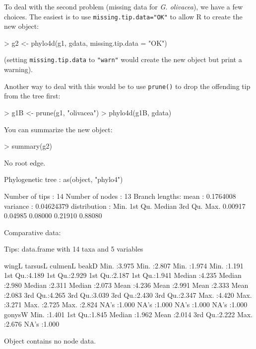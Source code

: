 \documentclass{article}
\newcommand{\code}[1]{{{\tt #1}}}
\begin{document}
To deal with the second problem
(missing data for \emph{G. olivacea}), we have a few choices.
The easiest is to use \code{missing.tip.data="OK"}
to allow R to create the new object:
\begin{Schunk}
\begin{Sinput}
> g2 <- phylo4d(g1, gdata, missing.tip.data = "OK")
\end{Sinput}
\end{Schunk}
(setting \code{missing.tip.data} to \code{"warn"}
would create the new object but print a warning).

Another way to deal with this would be to 
use \code{prune()} to drop
the offending tip from the tree first:
\begin{Schunk}
\begin{Sinput}
> g1B <- prune(g1, "olivacea")
> phylo4d(g1B, gdata)
\end{Sinput}
\end{Schunk}

You can summarize the new object:
\begin{Schunk}
\begin{Sinput}
> summary(g2)
\end{Sinput}
\begin{Soutput}
  No root edge.

 Phylogenetic tree : as(object, "phylo4") 

 Number of tips    : 14 
 Number of nodes   : 13 
 Branch lengths:
        mean         : 0.1764008 
        variance     : 0.04624379 
        distribution :
   Min. 1st Qu.  Median 3rd Qu.    Max. 
0.00917 0.04985 0.08000 0.21910 0.88080 

Comparative data:

Tips: data.frame with 14 taxa and 5 variables 

     wingL          tarsusL         culmenL          beakD      
 Min.   :3.975   Min.   :2.807   Min.   :1.974   Min.   :1.191  
 1st Qu.:4.189   1st Qu.:2.929   1st Qu.:2.187   1st Qu.:1.941  
 Median :4.235   Median :2.980   Median :2.311   Median :2.073  
 Mean   :4.236   Mean   :2.991   Mean   :2.333   Mean   :2.083  
 3rd Qu.:4.265   3rd Qu.:3.039   3rd Qu.:2.430   3rd Qu.:2.347  
 Max.   :4.420   Max.   :3.271   Max.   :2.725   Max.   :2.824  
 NA's   :1.000   NA's   :1.000   NA's   :1.000   NA's   :1.000  
     gonysW     
 Min.   :1.401  
 1st Qu.:1.845  
 Median :1.962  
 Mean   :2.014  
 3rd Qu.:2.222  
 Max.   :2.676  
 NA's   :1.000  

Object contains no node data.
\end{Soutput}
\end{Schunk}
\end{document}

